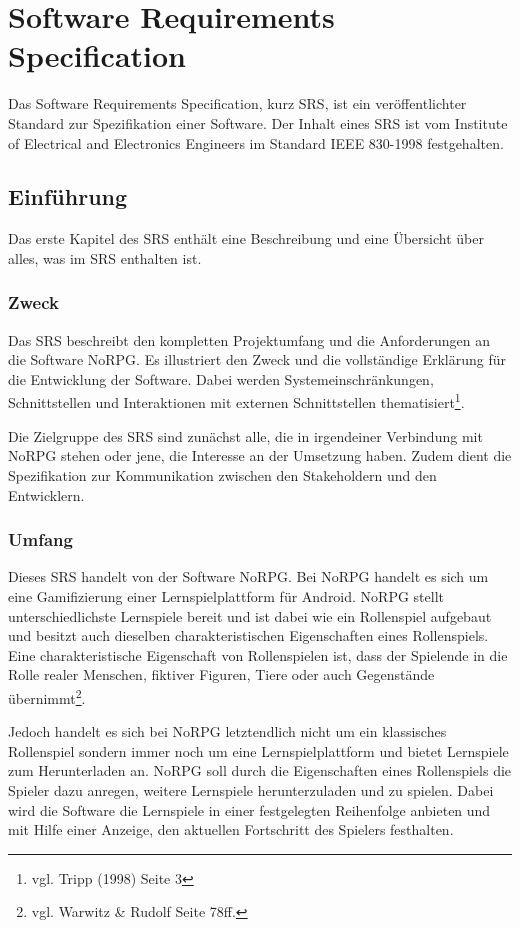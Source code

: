 \chapter{Software Requirements Specification}
	Das Software Requirements Specification, kurz SRS, ist ein veröffentlichter Standard zur Spezifikation einer Software. Der Inhalt eines SRS ist vom Institute of Electrical and Electronics Engineers im Standard IEEE 830-1998 festgehalten.
	
\section{Einführung}
	Das erste Kapitel des SRS enthält eine Beschreibung und eine Übersicht über alles, was im SRS enthalten ist.
	
	\subsection{Zweck}
		Das SRS beschreibt den kompletten Projektumfang und die Anforderungen an die Software NoRPG. Es illustriert den Zweck und die vollständige Erklärung für die Entwicklung der Software. Dabei werden Systemeinschränkungen, Schnittstellen und Interaktionen mit externen Schnittstellen thematisiert\footnote{vgl. Tripp \cite{srsIEEE}(1998) Seite 3}. 
	
		Die Zielgruppe des SRS sind zunächst alle, die in irgendeiner Verbindung mit NoRPG stehen oder jene, die Interesse an der Umsetzung haben. Zudem dient die Spezifikation zur Kommunikation zwischen den Stakeholdern und den Entwicklern.
		
	\subsection{Umfang}
		Dieses SRS handelt von der Software NoRPG. Bei NoRPG handelt es sich um eine Gamifizierung einer Lernspielplattform für Android. NoRPG stellt unterschiedlichste Lernspiele bereit und ist dabei wie ein Rollenspiel aufgebaut und besitzt auch dieselben charakteristischen Eigenschaften eines Rollenspiels. Eine charakteristische Eigenschaft von Rollenspielen ist, dass der Spielende in die Rolle realer Menschen, fiktiver Figuren, Tiere oder auch Gegenstände übernimmt\footnote{vgl. Warwitz & Rudolf \cite{rpgSinn} Seite 78ff.}. 
		
		Jedoch handelt es sich bei NoRPG letztendlich nicht um ein klassisches Rollenspiel sondern immer noch um eine Lernspielplattform und bietet Lernspiele zum Herunterladen an. NoRPG soll durch die Eigenschaften eines Rollenspiels die Spieler dazu anregen, weitere Lernspiele herunterzuladen und zu spielen. Dabei wird die Software die Lernspiele in einer festgelegten Reihenfolge anbieten und mit Hilfe einer Anzeige, den aktuellen Fortschritt des Spielers festhalten.		
		
